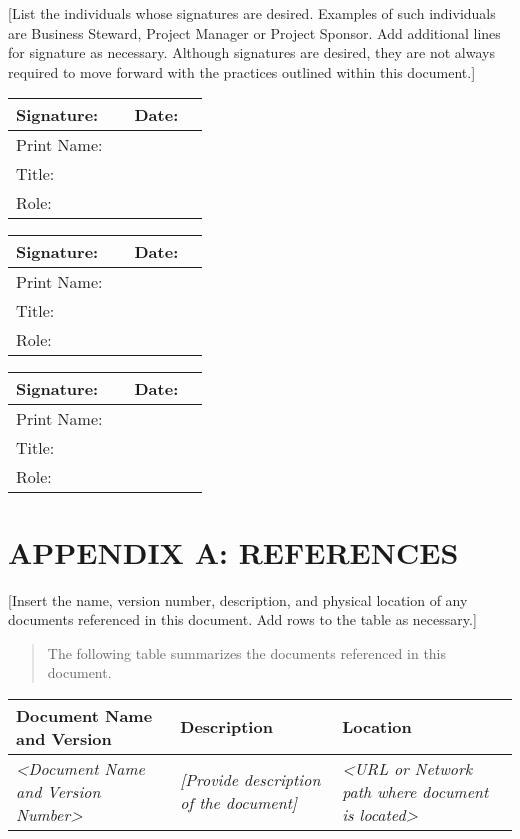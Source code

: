 \documentclass[a4paper, 11pt]{article}
\begin{document}
{[}List the individuals whose signatures are desired. Examples of such
individuals are Business Steward, Project Manager or Project Sponsor.
Add additional lines for signature as necessary. Although signatures are
desired, they are not always required to move forward with the practices
outlined within this document.{]}

\begin{longtable}[]{@{}llll@{}}
\toprule
Signature: & & Date: &\tabularnewline
\midrule
\endhead
Print Name: & & &\tabularnewline
Title: & & &\tabularnewline
Role: & & &\tabularnewline
\bottomrule
\end{longtable}

\begin{longtable}[]{@{}llll@{}}
\toprule
Signature: & & Date: &\tabularnewline
\midrule
\endhead
Print Name: & & &\tabularnewline
Title: & & &\tabularnewline
Role: & & &\tabularnewline
\bottomrule
\end{longtable}

\begin{longtable}[]{@{}llll@{}}
\toprule
Signature: & & Date: &\tabularnewline
\midrule
\endhead
Print Name: & & &\tabularnewline
Title: & & &\tabularnewline
Role: & & &\tabularnewline
\bottomrule
\end{longtable}

\newpage


\section{APPENDIX A: REFERENCES}

{[}Insert the name, version number, description, and physical location
of any documents referenced in this document. Add rows to the table as
necessary.{]}

\begin{quote}
The following table summarizes the documents referenced in this
document.
\end{quote}

\begin{longtable}[]{@{}lll@{}}
\toprule
\textbf{Document Name and Version} & \textbf{Description} &
\textbf{Location}\tabularnewline
\midrule
\endhead
\emph{\textless{}Document Name and Version Number\textgreater{}} &
\emph{{[}Provide description of the document{]}} & \emph{\textless{}URL
or Network path where document is located\textgreater{}}\tabularnewline
\bottomrule
\end{longtable}
\end{document}
